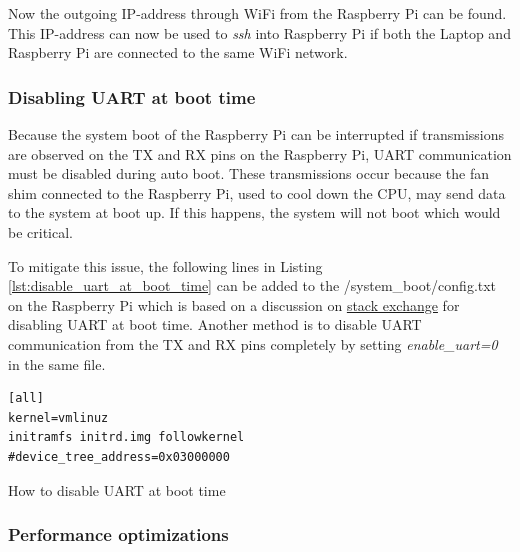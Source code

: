 \documentclass[../Head/report.tex]{subfiles}
\begin{document}
Now the outgoing IP-address through WiFi from the Raspberry Pi can be found. This IP-address can now be used to \textit{ssh} into Raspberry Pi if both the Laptop and Raspberry Pi are connected to the same WiFi network.

\subsubsection{Disabling UART at boot time}
\label{sec:disabling_uart_at_boot_time_pi}

Because the system boot of the Raspberry Pi can be interrupted if transmissions are observed on the TX and RX pins on the Raspberry Pi, UART communication must be disabled during auto boot. These transmissions occur 
because the fan shim connected to the Raspberry Pi, used to cool down the CPU, may send data to the system at boot up. If this happens, the system will not boot which would be critical. 

To mitigate this issue, the following lines in Listing \ref{lst:disable_uart_at_boot_time} can be added to the /system\_boot/config.txt on the Raspberry Pi which is based on a discussion on \href{https://askubuntu.com/questions/1215848/how-to-disable-ttyama0-console-on-boot-raspberry-pi}{stack exchange} for disabling UART at boot time. Another method is to disable UART communication from the TX and RX pins completely by setting \textit{enable\_uart=0} in the same file. 

\begin{listing}[H] 
\begin{tcolorbox}[
    enhanced,
    attach boxed title to top left={xshift=6mm,yshift=-3mm},
    colback=lightgreen!20,
    colframe=lightgreen,
    fonttitle=\bfseries\color{black},
]
\begin{verbatim}
[all]
kernel=vmlinuz
initramfs initrd.img followkernel
#device_tree_address=0x03000000
\end{verbatim}
\end{tcolorbox}
\caption{How to disable UART at boot time}
\label{lst:disable_uart_at_boot_time}    
\end{listing} 

\subsubsection{Performance optimizations}
\label{sec:performance optimizations_pi}
\end{document}
